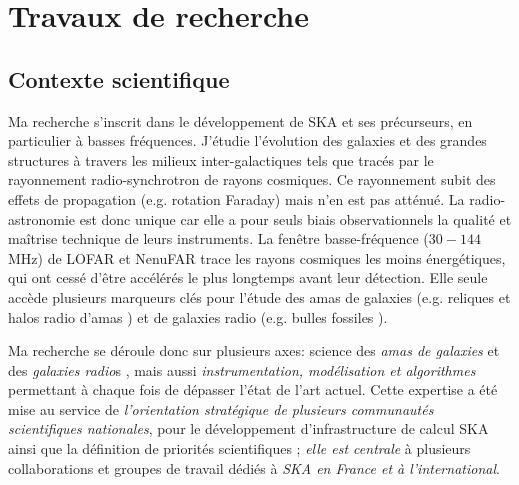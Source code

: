 
\chapter{Travaux de recherche} 


\section{Contexte scientifique}


\pg
Ma recherche s'inscrit dans le d\'eveloppement de SKA et ses pr\'ecurseurs, en particulier \`a basses fr\'equences. J'\'etudie l'\'evolution des galaxies et des grandes structures \`a travers les milieux inter-galactiques tels que trac\'es par le rayonnement radio-synchrotron de rayons cosmiques. Ce rayonnement subit des effets de propagation (e.g. rotation Faraday) mais n'en est pas att\'enu\'e. La radio-astronomie est donc unique car elle a pour seuls biais observationnels la qualité et maîtrise technique de leurs instruments.
La fenêtre basse-fréquence ($30-144$\,MHz) de LOFAR et NenuFAR trace les rayons cosmiques les moins énergétiques,
qui ont cess\'e d'\^etre acc\'el\'er\'es le plus longtemps avant leur d\'etection. Elle seule acc\`ede plusieurs marqueurs cl\'es pour l'\'etude des amas de galaxies (e.g. reliques et halos radio d'amas \cite{2019SSRv..215...16V}) et de galaxies radio (e.g. bulles fossiles \cite{2021NatAs...5.1261B}).%

\pg
Ma recherche se d\'eroule donc sur plusieurs axes: science des \textit{amas de galaxies} \cite[e.g.][]{2021Galax...9..105B, 2021AA...646A..56R, 2021ApJ...907...32B} et des \textit{galaxies radio}s \cite{2022A&A...658A..10B, 2022A&A...663A..44K}, mais aussi \textit{instrumentation, mod\'elisation et algorithmes} \cite{2020AA...637A..51B, 2018AA...615A..66B} permettant \`a chaque fois de d\'epasser l'\'etat de l'art actuel. Cette expertise a \'et\'e mise au service de \textit{l'orientation strat\'egique de plusieurs communaut\'es scientifiques nationales}, pour le d\'eveloppement d'infrastructure de calcul SKA \cite{2022arXiv220111526T} ainsi que la d\'efinition de priorit\'es scientifiques \cite{2023arXiv231110056K}; \textit{elle est centrale} \`a plusieurs collaborations et groupes de travail d\'edi\'es \`a \textit{SKA en France et \`a l'international}.






